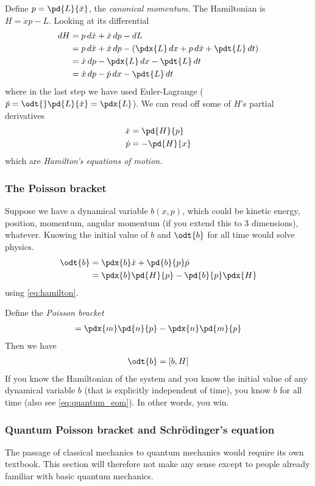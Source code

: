 \documentclass[12pt, oneside, letterpaper, fleqn]{article}
\begin{document}
Define $p = \pd{L}{\dot{x}}$, the \emph{canonical momentum}. The
Hamiltonian is $H = \dot{x}p - L$. Looking at its differential
\begin{align*}
dH &= p\,d\dot{x} + \dot{x}\,dp - dL\\
&= p\,d\dot{x} + \dot{x}\,dp - \left(\pdx{L}\,dx + p\,d\dot{x} +
\pdt{L}\,dt\right)\\
&= \dot{x}\,dp - \pdx{L}\,dx - \pdt{L}\,dt\\
&= \dot{x}\,dp - \dot{p}\,dx - \pdt{L}\,dt
\end{align*}
where in the last step we have used Euler-Lagrange ($\dot{p} =
\odt{}\pd{L}{\dot{x}} = \pdx{L}$). We can read off some of $H$'s partial
derivatives
\begin{align}\begin{split}\label{eq:hamilton}
\dot{x} &= \pd{H}{p}\\
\dot{p} &= -\pd{H}{x}
\end{split}\end{align}
which are \emph{Hamilton's equations of motion}.

\subsubsection{The Poisson bracket}
Suppose we have a dynamical variable $b(x,p)$, which could be kinetic
energy, position, momentum, angular momentum (if you extend this to 3
dimensions), whatever. Knowing the initial value of $b$ and $\odt{b}$
for all time would solve physics.
\begin{align*}
\odt{b} &= \pdx{b}\dot{x} + \pd{b}{p}\dot{p}\\
&= \pdx{b}\pd{H}{p} - \pd{b}{p}\pdx{H}
\end{align*}
using \eqref{eq:hamilton}.

Define the \emph{Poisson bracket}
\begin{align}
[m, n] = \pdx{m}\pd{n}{p} - \pdx{n}\pd{m}{p}
\end{align}
Then we have
\begin{align}\label{eq:classical_eom}
\odt{b} = [b, H]
\end{align}
If you know the Hamiltonian of the system and you know the initial value
of any dynamical variable $b$ (that is explicitly independent of time),
you know $b$ for all time (also see \eqref{eq:quantum_eom}). In other
words, you win.

\subsubsection{Quantum Poisson bracket and Schr\"odinger's
equation}\label{sec:quantum}
The passage of classical mechanics to quantum mechanics would require
its own textbook. This section will therefore not make any sense except
to people already familiar with basic quantum mechanics.
\end{document}
